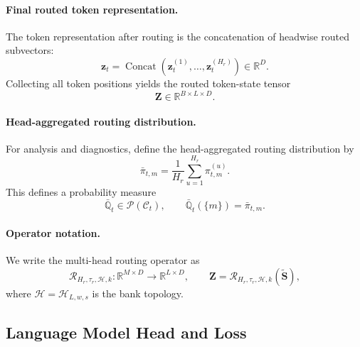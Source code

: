 \documentclass{article}
\theoremstyle{plain}
\theoremstyle{definition}
\theoremstyle{remark}
\begin{document}
\paragraph{Final routed token representation.}
The token representation after routing is the concatenation of headwise routed subvectors:
\begin{equation}
\label{eq:routed-token}
\mathbf z_t
=
\operatorname{Concat}(\mathbf z_t^{(1)},\dots,\mathbf z_t^{(H_r)})
\in\mathbb R^D.
\end{equation}
Collecting all token positions yields the routed token-state tensor
\begin{equation}
\label{eq:routed-tokens}
\mathbf Z\in\mathbb R^{B\times L\times D}.
\end{equation}

\paragraph{Head-aggregated routing distribution.}
For analysis and diagnostics, define the head-aggregated routing distribution by
\begin{equation}
\label{eq:aggregated-routing}
\bar\pi_{t,m}=\frac{1}{H_r}\sum_{u=1}^{H_r}\pi_{t,m}^{(u)}.
\end{equation}
This defines a probability measure
\begin{equation}
\label{eq:aggregated-routing-measure}
\bar{\mathbb Q}_t\in\mathcal P(\mathcal C_t),
\qquad
\bar{\mathbb Q}_t(\{m\})=\bar\pi_{t,m}.
\end{equation}

\paragraph{Operator notation.}
We write the multi-head routing operator as
\begin{equation}
\label{eq:routing-operator}
\mathcal R_{H_r,\tau_r,\mathcal H,k}:\mathbb R^{M\times D}\to\mathbb R^{L\times D},
\qquad
\mathbf Z=\mathcal R_{H_r,\tau_r,\mathcal H,k}(\widetilde{\mathbf S}),
\end{equation}
where $\mathcal H=\mathcal H_{L,w,s}$ is the bank topology.

\subsection{Language Model Head and Loss}
\label{sec:lm-head}
\end{document}
